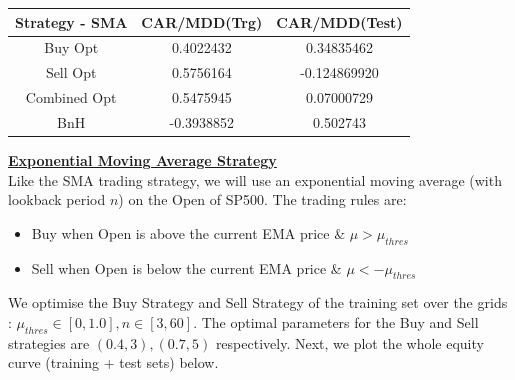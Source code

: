 \documentclass[12pt]{article}
\theoremstyle{definition}
\begin{document}
\begin{table}[h]
\centering
\begin{tabular}{|c|c|c|}
\hline
Strategy - SMA & CAR/MDD(Trg) & CAR/MDD(Test)\\
\hline
Buy Opt& 0.4022432 &0.34835462\\           
Sell Opt& 0.5756164 & -0.124869920\\
Combined Opt &0.5475945& 0.07000729\\
BnH &  -0.3938852 & 0.502743\\
\hline
\end{tabular}
  \label{fig:c4}
\end{table}
\newpage
\justify
\textbf{\underline{Exponential Moving Average Strategy}}\\
Like the SMA trading strategy, we will use an exponential moving average (with lookback period $n$) on the Open of SP500. The trading rules are:
\begin{itemize}
\item Buy when Open is above the current EMA price \& $\mu>\mu_{thres}$
\item Sell when Open is below the current EMA price \& $\mu<-\mu_{thres}$
\end{itemize}
We optimise the Buy Strategy and Sell Strategy of the training set over the grids : $\mu_{thres} \in [0,1.0],n \in [3,60]$. The optimal parameters for the Buy and Sell strategies are $(0.4,3),(0.7,5)$ respectively. Next, we plot the whole equity curve (training + test sets) below. 
\end{document}
